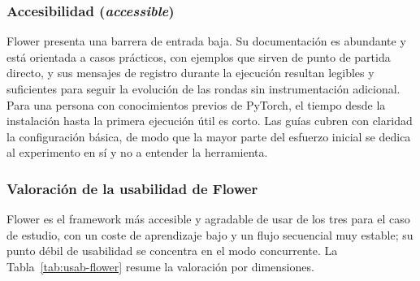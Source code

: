 \subsubsection{Accesibilidad (\textit{accessible})}\label{sec:usab-flower-accessible}

Flower presenta una barrera de entrada baja. Su documentación es abundante y está orientada
a casos prácticos, con ejemplos que sirven de punto de partida directo, y sus mensajes de
registro durante la ejecución resultan legibles y suficientes para seguir la evolución de las
rondas sin instrumentación adicional. Para una persona con conocimientos previos de PyTorch,
el tiempo desde la instalación hasta la primera ejecución útil es corto. Las guías cubren con
claridad la configuración básica, de modo que la mayor parte del esfuerzo inicial se dedica al
experimento en sí y no a entender la herramienta.

\subsubsection{Valoración de la usabilidad de Flower}\label{sec:usab-flower-valoracion}

Flower es el framework más accesible y agradable de usar de los tres para el
caso de estudio, con un coste de aprendizaje bajo y un flujo secuencial muy estable; su
punto débil de usabilidad se concentra en el modo concurrente. La
Tabla~\ref{tab:usab-flower} resume la valoración por dimensiones.

\begin{table}[htbp]
  \centering
  \caption{Valoración de la usabilidad de Flower según las cuatro dimensiones de la
  rúbrica (escala 1--5).}
  \label{tab:usab-flower}
\end{table}

